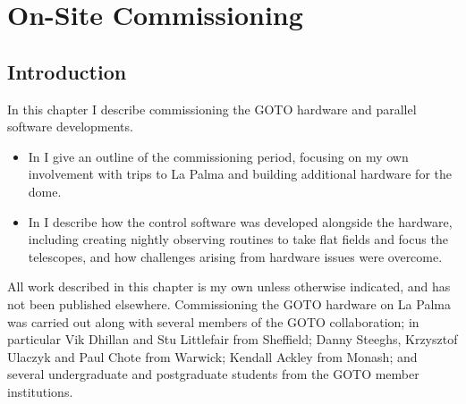 \chapter{On-Site Commissioning}
\label{chap:commissioning}
\chaptoc{}


\newpage
\section{Introduction}
\label{sec:commissioning_intro}
\begin{colsection}

In this chapter I describe commissioning the GOTO hardware and parallel software developments.
%
\begin{itemize}
    \item In  I give an outline of the commissioning period, focusing on my own involvement with trips to La Palma and building additional hardware for the dome.
    \item In  I describe how the control software was developed alongside the hardware, including creating nightly observing routines to take flat fields and focus the telescopes, and how challenges arising from hardware issues were overcome.
\end{itemize}
%
All work described in this chapter is my own unless otherwise indicated, and has not been published elsewhere. Commissioning the GOTO hardware on La Palma was carried out along with several members of the GOTO collaboration; in particular Vik Dhillan and Stu Littlefair from Sheffield; Danny Steeghs, Krzysztof Ulaczyk and Paul Chote from Warwick; Kendall Ackley from Monash; and several undergraduate and postgraduate students from the GOTO member institutions.

\end{colsection}


\newpage
